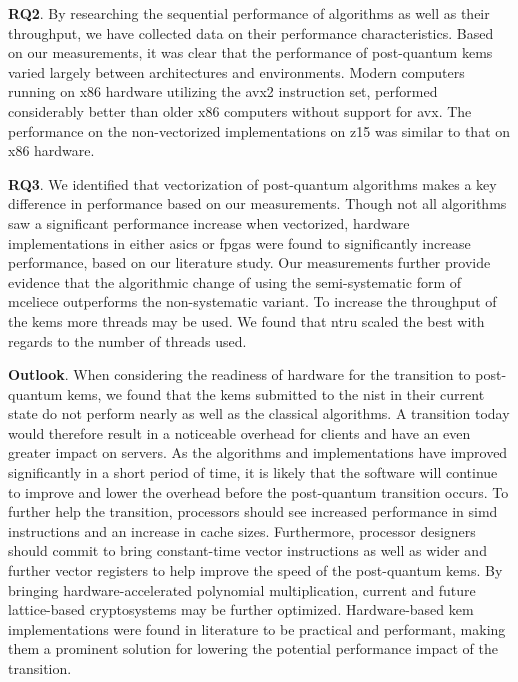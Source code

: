 \noindent\textbf{RQ2}. By researching the sequential performance of algorithms as well as their throughput, we have collected data on their performance characteristics. Based on our measurements, it was clear that the performance of \gls{post-quantum} \glspl{kem} varied largely between architectures and environments. Modern computers running on \gls{x86} hardware utilizing the \gls{avx2} instruction set, performed considerably better than older \gls{x86} computers without support for \gls{avx}. The performance on the non-vectorized implementations on \gls{z15} was similar to that on \gls{x86} hardware.

\noindent\textbf{RQ3}. We identified that vectorization of \gls{post-quantum} algorithms makes a key difference in performance based on our measurements. Though not all algorithms saw a significant performance increase when vectorized, hardware implementations in either \glspl{asic} or \glspl{fpga} were found to significantly increase performance, based on our literature study. Our measurements further provide evidence that the algorithmic change of using the semi-systematic form of \gls{mceliece} outperforms the non-systematic variant. To increase the throughput of the \glspl{kem} more threads may be used. We found that \gls{ntru} scaled the best with regards to the number of threads used.

\noindent\textbf{Outlook}. When considering the readiness of hardware for the transition to \gls{post-quantum} \glspl{kem}, we found that the \glspl{kem} submitted to the \gls{nist} in their current state do not perform nearly as well as the classical algorithms. A transition today would therefore result in a noticeable overhead for clients and have an even greater impact on servers. As the algorithms and implementations have improved significantly in a short period of time, it is likely that the software will continue to improve and lower the overhead before the \gls{post-quantum} transition occurs. To further help the transition, processors should see increased performance in \gls{simd} instructions and an increase in cache sizes. Furthermore, processor designers should commit to bring constant-time vector instructions as well as wider and further vector registers to help improve the speed of the \gls{post-quantum} \glspl{kem}. By bringing hardware-accelerated polynomial multiplication, current and future lattice-based cryptosystems may be further optimized. Hardware-based \gls{kem} implementations were found in literature to be practical and performant, making them a prominent solution for lowering the potential performance impact of the transition.

